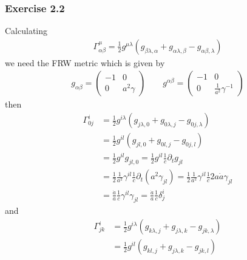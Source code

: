 \documentclass[10pt,a4paper]{book}
\theoremstyle{definition}
\begin{document}
\subsubsection{Exercise 2.2}
Calculating
\begin{align}
\Gamma^\mu_{\alpha\beta}=\frac{1}{2}g^{\mu\lambda}(g_{\beta\lambda,\alpha}+g_{\alpha\lambda,\beta}-g_{\alpha\beta,\lambda})
\end{align}
we need the FRW metric which is given by
\begin{align}
g_{\alpha\beta}=\left(\begin{array}{cc}
-1&0\\
0&a^2\gamma
\end{array}
\right)\qquad
g^{\alpha\beta}=\left(\begin{array}{cc}
-1&0\\
0&\frac{1}{a^2}\gamma^{-1}
\end{array}
\right)
\end{align}
then
\begin{align}
\Gamma^i_{0j}
&=\frac{1}{2}g^{i\lambda}(g_{j\lambda,0}+g_{0\lambda,j}-g_{0j,\lambda})\\
&=\frac{1}{2}g^{il}(g_{jl,0}+g_{0l,j}-g_{0j,l})\\
&=\frac{1}{2}g^{il}g_{jl,0}=\frac{1}{2}g^{il}\frac{1}{c}\partial_tg_{jl}\\
&=\frac{1}{2}\frac{1}{a^2}\gamma^{il}\frac{1}{c}\partial_t(a^2\gamma_{jl})=\frac{1}{2}\frac{1}{a^2}\gamma^{il}\frac{1}{c}2a\dot a\gamma_{jl}\\
&=\frac{\dot a}{a}\frac{1}{c}\gamma^{il}\gamma_{jl}=\frac{\dot a}{a}\frac{1}{c}\delta^i_j
\end{align}
and
\begin{align}
\Gamma^i_{jk}
&=\frac{1}{2}g^{i\lambda}(g_{k\lambda,j}+g_{j\lambda,k}-g_{jk,\lambda})\\
&=\frac{1}{2}g^{il}(g_{kl,j}+g_{j\lambda,k}-g_{jk,l})
\end{align}
\end{document}
